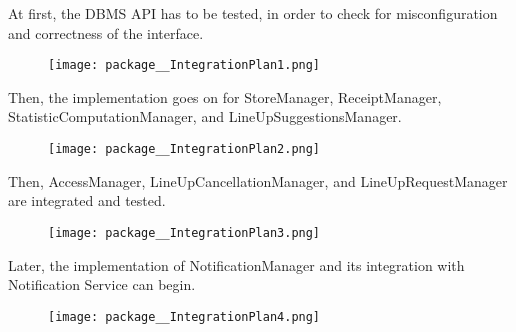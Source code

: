 \documentclass[../../main.tex]{subfiles}
\begin{document}
\begin{enumerate}

	\noindent\begin{minipage}{0.9\textwidth}

	\item At first, the DBMS API has to be tested, in order to check for misconfiguration and correctness of the interface.

	\begin{figure}[H]
    \centering
    \texttt{[image: package\_\_IntegrationPlan1.png]}
	\end{figure}

	\end{minipage}

	\noindent\begin{minipage}{0.9\textwidth}
		
	\item Then, the implementation goes on for StoreManager, ReceiptManager, StatisticComputationManager, and LineUpSuggestionsManager. 
	
	\begin{figure}[H]
    \centering
    \texttt{[image: package\_\_IntegrationPlan2.png]}
	\end{figure}

	\end{minipage}

	\noindent\begin{minipage}{0.9\textwidth}
	
	\item Then, AccessManager, LineUpCancellationManager, and LineUpRequestManager are integrated and tested.
	
	\begin{figure}[H]
    \centering
    \texttt{[image: package\_\_IntegrationPlan3.png]}
	\end{figure}

	\end{minipage}

	\noindent\begin{minipage}{0.9\textwidth}
	
	\item Later, the implementation of NotificationManager and its integration with Notification Service can begin. 

	\begin{figure}[H]
    \centering
    \texttt{[image: package\_\_IntegrationPlan4.png]}
	\end{figure}


\end{minipage}
\end{enumerate}
\end{document}
